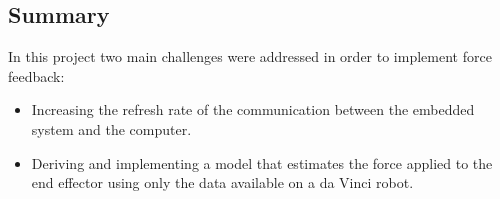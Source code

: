 


\subsection*{Summary}

In this project two main challenges were addressed in order to implement force feedback:

\begin{itemize}
\item Increasing the refresh rate of the communication between the embedded system and the computer.
\item Deriving and implementing a model that estimates the force applied to the end effector using only the data available on a da Vinci robot.  
\end{itemize}

%
